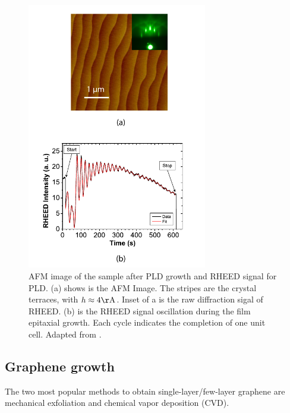 \documentclass[pdflatex, sectionletters, 12pt]{pittetd}    %
\begin{document}
\begin{figure}[hp!]
	\centering
	\includegraphics[width=0.7\textwidth]{Drawing/PLD_RHEED.pdf}
	\caption{AFM image of the sample after PLD growth and RHEED signal for PLD. (a) shows is the AFM Image. The stripes are the crystal terraces, with $h \approx 4 \mathrm{\AA}$. Inset of a is the raw diffraction sigal of RHEED. (b) is the RHEED signal oscillation during the film epitaxial growth. Each cycle indicates the completion of one unit cell. Adapted from \cite{podkaminer2016real}.}
	\label{FIG:RHEED}
\end{figure}


\subsection{Graphene growth}

The two most popular methods to obtain single-layer/few-layer graphene are mechanical exfoliation and chemical vapor deposition (CVD). 
\end{document}
